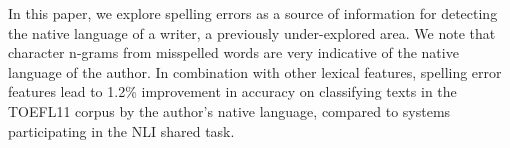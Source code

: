 In this paper, we explore spelling errors as a source of information for detecting the native language of a writer, a previously under-explored area. We note that character n-grams from misspelled words are very indicative of the native language of the author. In combination with other lexical features, spelling error features lead to 1.2\% improvement in accuracy on classifying texts in the TOEFL11 corpus by the author's native language, compared to systems participating in the NLI shared task.
